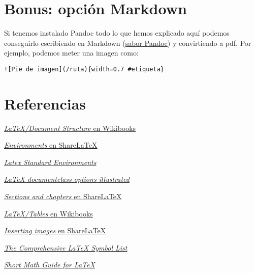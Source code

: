 \section{Bonus: opción Markdown}\label{bonus-opciuxf3n-markdown}

Si tenemos instalado Pandoc todo lo que hemos explicado aquí podemos
conseguirlo escribiendo en Markdown
(\href{http://rmarkdown.rstudio.com/authoring_pandoc_markdown.html}{sabor
Pandoc}) y convirtiendo a pdf. Por ejemplo, podemos meter una imagen
como:

\begin{lstlisting}
![Pie de imagen](/ruta){width=0.7 #etiqueta}
\end{lstlisting}

\section{Referencias}\label{referencias}

\href{https://en.wikibooks.org/wiki/LaTeX/Document_Structure}{\emph{LaTeX/Document
Structure} en Wikibooks}

\href{https://www.sharelatex.com/learn/Environments}{\emph{Environments}
en ShareLaTeX}

\href{http://www.personal.ceu.hu/tex/environ.htm}{\emph{Latex Standard
Environments}}

\href{http://texblog.org/2013/02/13/latex-documentclass-options-illustrated/}{\emph{LaTeX
documentclass options illustrated}}

\href{https://www.sharelatex.com/learn/Sections_and_chapters}{\emph{Sections
and chapters} en ShareLaTeX}

\href{https://en.wikibooks.org/wiki/LaTeX/Tables}{\emph{LaTeX/Tables} en
Wikibooks}

\href{https://www.sharelatex.com/learn/Inserting_Images}{\emph{Inserting
images} en ShareLaTeX}

\href{http://osl.ugr.es/CTAN/info/symbols/comprehensive/symbols-a4.pdf}{\emph{The
Comprehensive LaTeX Symbol List}}

\href{ftp://ftp.ams.org/pub/tex/doc/amsmath/short-math-guide.pdf}{\emph{Short
Math Guide for LaTeX}}
